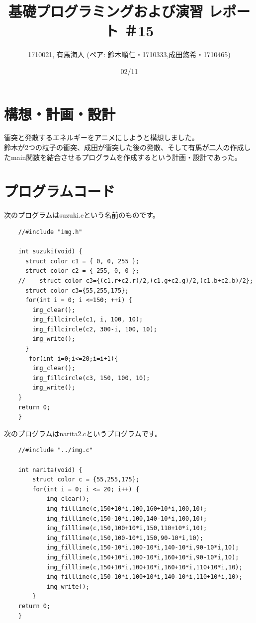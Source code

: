\documentclass[12pt,a4j]{jarticle}
\begin{document}
\title{基礎プログラミングおよび演習 レポート ＃15}
\author{1710021, 有馬海人 (ペア: 鈴木順仁・1710333,成田悠希・1710465)}
\date{02/11}
\maketitle

\section{構想・計画・設計}
衝突と発散するエネルギーをアニメにしようと構想しました。\\鈴木が2つの粒子の衝突、成田が衝突した後の発散、そして有馬が二人の作成したmain関数を結合させるプログラムを作成するという計画・設計であった。


\section{プログラムコード}
次のプログラムはsuzuki.cという名前のものです。
\begin{verbatim}
    //#include "img.h"

    int suzuki(void) {
      struct color c1 = { 0, 0, 255 };
      struct color c2 = { 255, 0, 0 };
    //    struct color c3={(c1.r+c2.r)/2,(c1.g+c2.g)/2,(c1.b+c2.b)/2};
      struct color c3={55,255,175};
      for(int i = 0; i <=150; ++i) {
        img_clear();
        img_fillcircle(c1, i, 100, 10);
        img_fillcircle(c2, 300-i, 100, 10);
        img_write();
      }
       for(int i=0;i<=20;i=i+1){
        img_clear();
        img_fillcircle(c3, 150, 100, 10);
        img_write();
    }
    return 0;
    }
\end{verbatim}

次のプログラムはnarita2.cというプログラムです。
\begin{verbatim}
    //#include "../img.c"

    int narita(void) {
        struct color c = {55,255,175};
        for(int i = 0; i <= 20; i++) {
            img_clear();
            img_fillline(c,150+10*i,100,160+10*i,100,10);
            img_fillline(c,150-10*i,100,140-10*i,100,10);
            img_fillline(c,150,100+10*i,150,110+10*i,10);
            img_fillline(c,150,100-10*i,150,90-10*i,10);
            img_fillline(c,150-10*i,100-10*i,140-10*i,90-10*i,10);
            img_fillline(c,150+10*i,100-10*i,160+10*i,90-10*i,10);
            img_fillline(c,150+10*i,100+10*i,160+10*i,110+10*i,10);
            img_fillline(c,150-10*i,100+10*i,140-10*i,110+10*i,10);
            img_write();
        }
    return 0;
    }
\end{verbatim}
\end{document}
